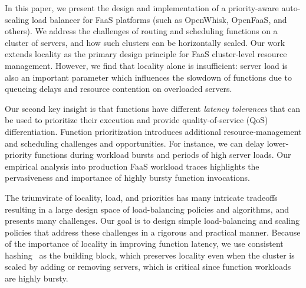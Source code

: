 In this paper, we present the design and implementation of a priority-aware auto-scaling load balancer for FaaS platforms (such as OpenWhisk, OpenFaaS, and others). 
We address the challenges of routing and scheduling functions on a cluster of servers, and how such clusters can be horizontally scaled.
Our work extends locality as the primary design principle for FaaS cluster-level resource management. 
However, we find that locality alone is insufficient: server load is also an important parameter which influences the slowdown of functions due to queueing delays and resource contention on overloaded servers.


Our second key insight is that functions have different \emph{latency tolerances} that can be used to prioritize their execution and provide quality-of-service (QoS) differentiation.
Function prioritization introduces additional resource-management and scheduling challenges and opportunities.
For instance, we can delay lower-priority functions during workload bursts and periods of high server loads.
Our empirical analysis into production FaaS workload traces highlights the pervasiveness and importance of highly bursty function invocations.


The triumvirate of locality, load, and priorities has many intricate tradeoffs resulting in a large design space of load-balancing policies and algorithms, and presents many challenges. 
Our goal is to design simple load-balancing and scaling policies that address these challenges in a rigorous and practical manner.
Because of the importance of locality in improving function latency, we use consistent hashing~\cite{karger1997consistent} as the building block, which preserves locality even when the cluster is scaled by adding or removing servers, which is critical since function workloads are highly bursty. 



